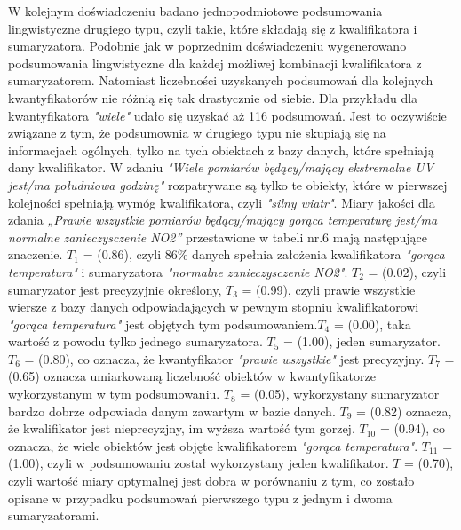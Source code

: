 \documentclass{article}
\begin{document}
W kolejnym doświadczeniu badano jednopodmiotowe podsumowania lingwistyczne drugiego typu, czyli takie, które składają się z kwalifikatora i sumaryzatora. Podobnie jak w poprzednim doświadczeniu wygenerowano podsumowania lingwistyczne dla każdej możliwej kombinacji kwalifikatora z sumaryzatorem. Natomiast liczebności uzyskanych podsumowań dla kolejnych kwantyfikatorów nie różnią się tak drastycznie od siebie. Dla przykładu dla kwantyfikatora \textit{"wiele"} udało się uzyskać aż 116 podsumowań. Jest to oczywiście związane z tym, że podsumownia w drugiego typu nie skupiają się na informacjach ogólnych, tylko na tych obiektach z bazy danych, które spełniają dany kwalifikator. W zdaniu \textit{"Wiele pomiarów będący/mający ekstremalne UV jest/ma południowa godzinę"} rozpatrywane są tylko te obiekty, które w pierwszej kolejności spełniają wymóg kwalifikatora, czyli \textit{"silny wiatr"}. Miary jakości dla zdania \textit{„Prawie wszystkie pomiarów będący/mający gorąca temperaturę jest/ma normalne zanieczysczenie NO2”} przestawione w tabeli nr.6 mają następujące znaczenie. \(T_1\) = (0.86), czyli 86\% danych spełnia założenia kwalifikatora \textit{"gorąca temperatura"} i sumaryzatora \textit{"normalne zanieczysczenie NO2"}. \(T_2\) = (0.02), czyli sumaryzator jest precyzyjnie określony, \(T_3\) = (0.99), czyli prawie wszystkie wiersze z bazy danych odpowiadających w pewnym stopniu kwalifikatorowi \textit{"gorąca temperatura"} jest objętych tym podsumowaniem.\(T_4\) = (0.00), taka wartość z powodu tylko jednego sumaryzatora. \(T_5\) = (1.00), jeden sumaryzator. \(T_6\) = (0.80), co oznacza, że kwantyfikator \textit{"prawie wszystkie"} jest precyzyjny. \(T_7\) = (0.65) oznacza umiarkowaną liczebność obiektów w kwantyfikatorze wykorzystanym w tym podsumowaniu. \(T_8\) = (0.05), wykorzystany sumaryzator bardzo dobrze odpowiada danym zawartym w bazie danych. \(T_9\) = (0.82) oznacza, że kwalifikator jest nieprecyzjny, im wyższa wartość tym gorzej. \(T_{10}\) = (0.94), co oznacza, że wiele obiektów jest objęte kwalifikatorem \textit{"gorąca temperatura"}. \(T_{11}\) = (1.00), czyli w podsumowaniu został wykorzystany jeden kwalifikator. \(T\) = (0.70), czyli wartość miary optymalnej jest dobra w porównaniu z tym, co zostało opisane w przypadku podsumowań pierwszego typu z jednym i dwoma sumaryzatorami. 
\end{document}
